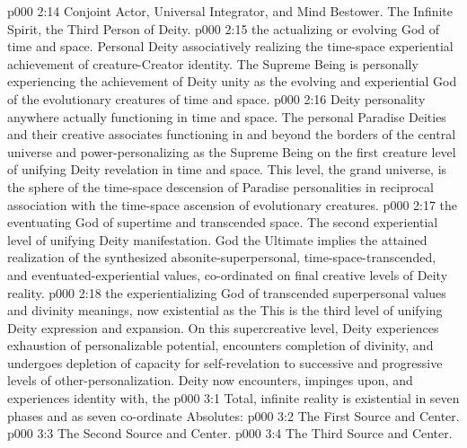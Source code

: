 \vs p000 2:14 \bibnobreakspace {}Conjoint Actor, Universal Integrator, and Mind Bestower. The Infinite Spirit, the Third Person of Deity.
\vs p000 2:15 \bibnobreakspace {}the actualizing or evolving God of time and space. Personal Deity associatively realizing the time\hyp{}space experiential achievement of creature\hyp{}Creator identity. The Supreme Being is personally experiencing the achievement of Deity unity as the evolving and experiential God of the evolutionary creatures of time and space.
\vs p000 2:16 \bibnobreakspace {}Deity personality anywhere actually functioning in time and space. The personal Paradise Deities and their creative associates functioning in and beyond the borders of the central universe and power\hyp{}personalizing as the Supreme Being on the first creature level of unifying Deity revelation in time and space. This level, the grand universe, is the sphere of the time\hyp{}space descension of Paradise personalities in reciprocal association with the time\hyp{}space ascension of evolutionary creatures.
\vs p000 2:17 \bibnobreakspace {}the eventuating God of supertime and transcended space. The second experiential level of unifying Deity manifestation. God the Ultimate implies the attained realization of the synthesized absonite\hyp{}superpersonal, time\hyp{}space\hyp{}transcended, and eventuated\hyp{}experiential values, co\hyp{}ordinated on final creative levels of Deity reality.
\vs p000 2:18 \bibnobreakspace {}the experientializing God of transcended superpersonal values and divinity meanings, now existential as the  This is the third level of unifying Deity expression and expansion. On this supercreative level, Deity experiences exhaustion of personalizable potential, encounters completion of divinity, and undergoes depletion of capacity for self\hyp{}revelation to successive and progressive levels of other\hyp{}personalization. Deity now encounters, impinges upon, and experiences identity with, the 
\vs p000 3:1 Total, infinite reality is existential in seven phases and as seven co\hyp{}ordinate Absolutes:
\pc \vs p000 3:2 \bibnobreakspace The First Source and Center.
\vs p000 3:3 \bibnobreakspace The Second Source and Center.
\vs p000 3:4 \bibnobreakspace The Third Source and Center.
